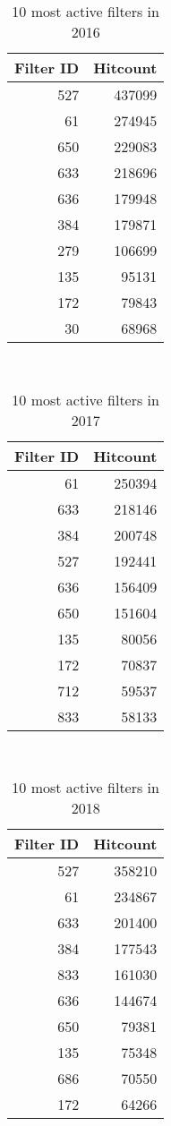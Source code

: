 \begin{table}
  \centering
  \begin{tabular}{r r }
    Filter ID & Hitcount \\
    \hline
    527 & 437099 \\
    61 & 274945 \\
    650 & 229083 \\
    633 & 218696 \\
    636 & 179948 \\
    384 & 179871 \\
    279 & 106699 \\
    135 & 95131 \\
    172 & 79843 \\
    30 & 68968 \\
  \end{tabular}
  \caption{10 most active filters in 2016}~\label{tab:most-active-2016}
\end{table}

\begin{table}
  \centering
  \begin{tabular}{r r }
    Filter ID & Hitcount \\
    \hline
    61 & 250394 \\
    633 & 218146 \\
    384 & 200748 \\
    527 & 192441 \\
    636 & 156409 \\
    650 & 151604 \\
    135 & 80056 \\
    172 & 70837 \\
    712 & 59537 \\
    833 & 58133 \\
  \end{tabular}
  \caption{10 most active filters in 2017}~\label{tab:most-active-2017}
\end{table}

\begin{table}
  \centering
  \begin{tabular}{r r }
    Filter ID & Hitcount \\
    \hline
    527 & 358210 \\
    61 & 234867 \\
    633 & 201400 \\
    384 & 177543 \\
    833 & 161030 \\
    636 & 144674 \\
    650 & 79381 \\
    135 & 75348 \\
    686 & 70550 \\
    172 & 64266 \\
  \end{tabular}
  \caption{10 most active filters in 2018}~\label{tab:most-active-2018}
\end{table}

